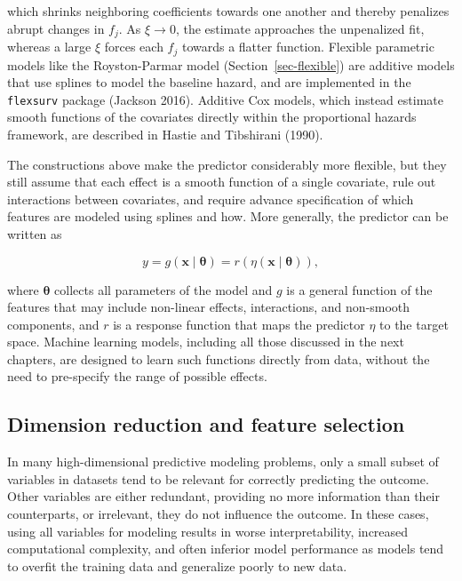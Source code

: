 \documentclass[
  letterpaper,
  krantz2]{style/krantz}
\begin{document}
which shrinks neighboring coefficients towards one another and thereby
penalizes abrupt changes in \(f_j\). As \(\xi \to 0\), the estimate
approaches the unpenalized fit, whereas a large \(\xi\) forces each
\(f_j\) towards a flatter function. Flexible parametric models like the
Royston-Parmar model (Section~\ref{sec-flexible}) are additive models
that use splines to model the baseline hazard, and are implemented in
the \texttt{flexsurv} package (Jackson 2016). Additive Cox models, which
instead estimate smooth functions of the covariates directly within the
proportional hazards framework, are described in Hastie and Tibshirani
(1990).

The constructions above make the predictor considerably more flexible,
but they still assume that each effect is a smooth function of a single
covariate, rule out interactions between covariates, and require advance
specification of which features are modeled using splines and how. More
generally, the predictor can be written as

\[
y = g(\mathbf{x}\mid \boldsymbol{\theta}) = r(\eta(\mathbf{x}\mid \boldsymbol{\theta})),
\]

where \(\boldsymbol{\theta}\) collects all parameters of the model and
\(g\) is a general function of the features that may include non-linear
effects, interactions, and non-smooth components, and \(r\) is a
response function that maps the predictor
\(\eta\) to the target space. Machine learning models, including all
those discussed in the next chapters, are designed to learn such
functions directly from data, without the need to pre-specify the range
of possible effects.

\subsection{Dimension reduction and feature
selection}\label{dimension-reduction-and-feature-selection}

In many high-dimensional predictive modeling problems, only a small
subset of variables in datasets tend to be relevant for correctly
predicting the outcome. Other variables are either redundant, providing
no more information than their counterparts, or irrelevant, they do not
influence the outcome. In these cases, using all variables for modeling
results in worse interpretability, increased computational complexity,
and often inferior model performance as models tend to overfit the
training data and generalize poorly to new data.
\end{document}
